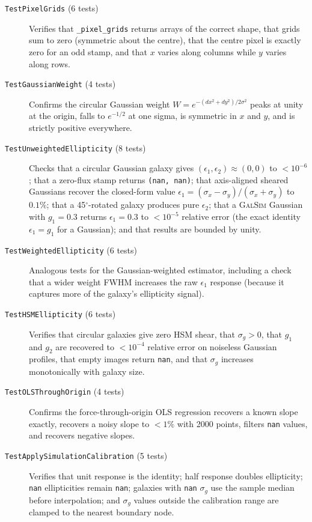 \begin{description}
  \item[\texttt{TestPixelGrids} (6 tests)]
    Verifies that \texttt{\_pixel\_grids} returns arrays of the correct shape,
    that grids sum to zero (symmetric about the centre), that the centre pixel
    is exactly zero for an odd stamp, and that $x$ varies along columns while
    $y$ varies along rows.

  \item[\texttt{TestGaussianWeight} (4 tests)]
    Confirms the circular Gaussian weight $W = e^{-(dx^2+dy^2)/2\sigma^2}$ peaks
    at unity at the origin, falls to $e^{-1/2}$ at one sigma, is symmetric in
    $x$ and $y$, and is strictly positive everywhere.

  \item[\texttt{TestUnweightedEllipticity} (8 tests)]
    Checks that a circular Gaussian galaxy gives $(\epsilon_1,\epsilon_2)
    \approx (0,0)$ to $<10^{-6}$; that a zero-flux stamp returns
    \texttt{(nan,\,nan)}; that axis-aligned sheared Gaussians recover the
    closed-form value $\epsilon_1 = (\sigma_x - \sigma_y)/(\sigma_x + \sigma_y)$
    to $0.1\%$; that a 45$^\circ$-rotated galaxy produces pure $\epsilon_2$; that
    a \textsc{GalSim} Gaussian with $g_1 = 0.3$ returns $\epsilon_1 = 0.3$ to
    $<10^{-5}$ relative error (the exact identity $\epsilon_1 = g_1$ for a
    Gaussian); and that results are bounded by unity.

  \item[\texttt{TestWeightedEllipticity} (6 tests)]
    Analogous tests for the Gaussian-weighted estimator, including a check that
    a wider weight FWHM increases the raw $\epsilon_1$ response (because it
    captures more of the galaxy's ellipticity signal).

  \item[\texttt{TestHSMEllipticity} (6 tests)]
    Verifies that circular galaxies give zero HSM shear, that $\sigma_g > 0$,
    that $g_1$ and $g_2$ are recovered to $<10^{-4}$ relative error on noiseless
    Gaussian profiles, that empty images return \texttt{nan}, and that $\sigma_g$
    increases monotonically with galaxy size.

  \item[\texttt{TestOLSThroughOrigin} (4 tests)]
    Confirms the force-through-origin OLS regression recovers a known slope
    exactly, recovers a noisy slope to $<1\%$ with 2000 points, filters
    \texttt{nan} values, and recovers negative slopes.

  \item[\texttt{TestApplySimulationCalibration} (5 tests)]
    Verifies that unit response is the identity; half response doubles
    ellipticity; \texttt{nan} ellipticities remain \texttt{nan}; galaxies with
    \texttt{nan} $\sigma_g$ use the sample median before interpolation; and
    $\sigma_g$ values outside the calibration range are clamped to the nearest
    boundary node.
\end{description}


